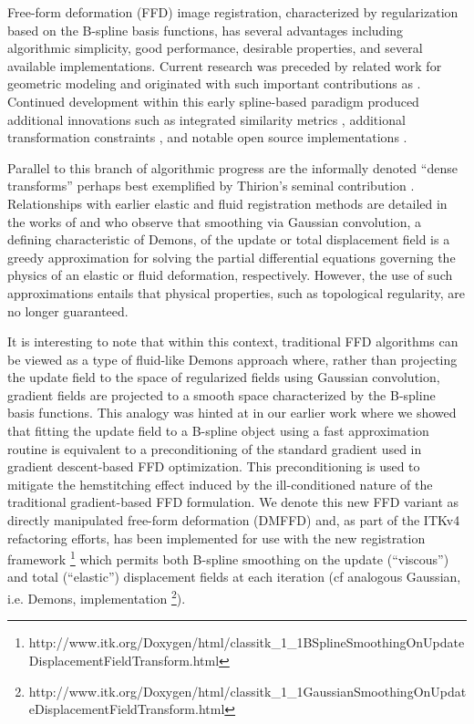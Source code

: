 \documentclass{frontiersSCNS}
\begin{document}
Free-form deformation (FFD) image registration, characterized by  regularization based on the B-spline basis functions, has several
advantages including algorithmic simplicity,
good performance, desirable properties, and several available
implementations.  Current research was
preceded by related work for
geometric modeling \citep{sederberg1986} and originated with such important
contributions as \cite{szeliski1997,thevenaz1998,rueckert1999}.
Continued development within this early spline-based paradigm produced additional innovations such as integrated similarity metrics \citep[e.g.][]{mattes2003}, additional transformation constraints \citep[e.g.][]{rohlfing2003}, and notable open source implementations \citep[e.g.][]{ibanez2005,klein2010,modat2010,shackleford2010}.

Parallel to this branch of algorithmic progress are the informally
denoted ``dense transforms''
perhaps best exemplified by Thirion's seminal contribution \citep{thirion1998}.
Relationships with earlier elastic \citep{bajcsy1989,gee1993} and fluid \citep{christensen1996} registration methods are detailed in
the works of \cite{bro-nielsen1996} and \cite{pennec1999} who observe that
smoothing via Gaussian convolution, a defining characteristic of Demons,
of the update or total displacement
field is a greedy approximation for solving the partial differential equations governing
the physics of an elastic or fluid deformation, respectively.  However, the use of such
approximations entails that physical properties, such as topological
regularity, are no longer guaranteed.

It is interesting to note that within this context, traditional FFD algorithms
can be viewed as a type of fluid-like Demons approach
where, rather than projecting the update field to the space
of regularized fields using Gaussian convolution, gradient fields
are projected to a smooth space characterized by the B-spline
basis functions.  This analogy was hinted at in our earlier work \citep{tustison2009} where we showed that fitting the update field to a B-spline object using a fast approximation routine \citep{tustison2006} is equivalent to a preconditioning of the standard gradient used in gradient descent-based FFD optimization.
This preconditioning is used to mitigate the hemstitching effect induced by the ill-conditioned nature of the traditional gradient-based FFD formulation.  We denote
this new FFD variant as directly manipulated free-form deformation (DMFFD) and, 
as part of the ITKv4 refactoring efforts, has been implemented for use with the new
registration framework%
\footnote{
http://www.itk.org/Doxygen/html/classitk\_1\_1BSplineSmoothingOnUpdateDisplacementFieldTransform.html
}
which permits both B-spline smoothing on the update (``viscous'') and total (``elastic'')
displacement fields at each iteration (cf
analogous Gaussian, i.e. Demons, implementation%
\footnote{
http://www.itk.org/Doxygen/html/classitk\_1\_1GaussianSmoothingOnUpdateDisplacementFieldTransform.html
}).
\end{document}
